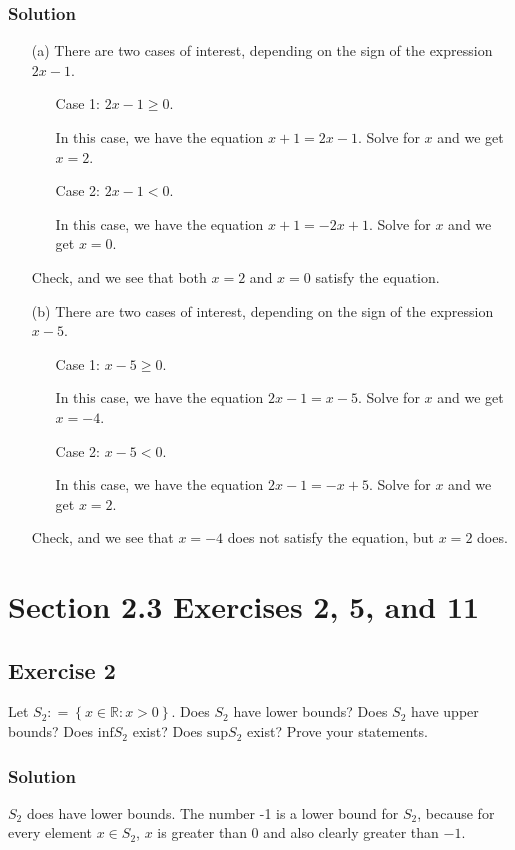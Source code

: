 \documentclass[12pt]{article}
\begin{document}
\subsubsection*{Solution}
\begin{itemize}
\item[(a)] There are two cases of interest, depending on the sign of the expression $2x - 1$.
\begin{itemize}
\item[Case 1:] $2x - 1 \geq 0$.

In this case, we have the equation $x + 1 = 2x - 1$. Solve for $x$ and we get $x = 2$.

\item[Case 2:] $2x - 1 < 0$.

In this case, we have the equation $x + 1 = -2x + 1$. Solve for $x$ and we get $x = 0$.
\end{itemize}
Check, and we see that both $x = 2$ and $x = 0$ satisfy the equation.

\item[(b)] There are two cases of interest, depending on the sign of the expression $x - 5$.
\begin{itemize}
\item[Case 1:] $x - 5 \geq 0$.

In this case, we have the equation $2x - 1 = x - 5$. Solve for $x$ and we get $x = -4$.

\item[Case 2:] $x - 5 < 0$.

In this case, we have the equation $2x - 1 = -x + 5$. Solve for $x$ and we get $x = 2$.
\end{itemize}
Check, and we see that $x = -4$ does not satisfy the equation, but $x = 2$ does.
\end{itemize}

\section*{Section 2.3 Exercises 2, 5, and 11}

\subsection*{Exercise 2}
Let $S_2 \mathrel{\mathop:}= \left\{x \in \mathbb{R} : x > 0\right\}$. Does $S_2$ have lower bounds? Does $S_2$ have upper bounds? Does $\text{inf}S_2$ exist? Does $\text{sup}S_2$ exist? Prove your statements.

\subsubsection*{Solution}
$S_2$ does have lower bounds. The number -1 is a lower bound for $S_2$, because for every element $x \in S_2$, $x$ is greater than $0$ and also clearly greater than $-1$.
\end{document}
